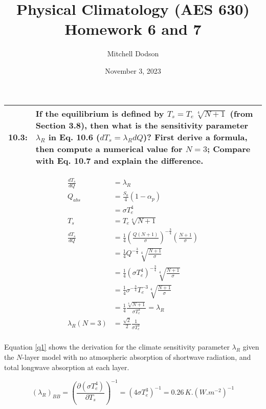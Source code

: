 \documentclass[12pt]{article}
\title{Physical Climatology (AES 630) Homework 6 and 7}
\author{Mitchell Dodson}
\date{November 3, 2023}
\newcommand*{\problem}[2]{
    \begin{table}[ht]
    \centering
        \begin{tabular}{ | p{.1\linewidth} p{.9\linewidth} | }
            \hline
            \vspace{.3em}\textbf{\large#1:} & \vspace{.3em}\small{#2}\hspace{.2em}\vspace{.5em} \\ \hline
        \end{tabular}
    \end{table}
}
\begin{document}
\maketitle

\problem{10.3}{
    If the equilibrium is defined by $T_s = T_e \, \sqrt[4]{N+1}$ (from Section 3.8), then what is the sensitivity parameter $\lambda_R$ in Eq. 10.6 ($dT_s = \lambda_R dQ$)? First derive a formula, then compute a numerical value for $N=3$; Compare with Eq. 10.7 and explain the difference.
} %

\begin{equation}\label{q1}
    \begin{split}
        \frac{dT_s}{dQ} &= \lambda_R \\
        Q_{abs} &= \frac{S_0}{4} (1-\alpha_p) \\
        &= \sigma T_e^4 \\
        T_s &= T_e\sqrt[4]{N+1} \\
        \frac{dT_s}{dQ} &= \frac{1}{4} \left(\frac{Q(N+1)}{\sigma}\right)^{-\frac{3}{4}} \left(\frac{N+1}{\sigma}\right) \\
        &= \frac{1}{4} Q^{-\frac{3}{4}} \sqrt[4]{\frac{N+1}{\sigma}} \\
        &= \frac{1}{4} (\sigma T_e^4)^{-\frac{3}{4}} \sqrt[4]{\frac{N+1}{\sigma}} \\
        &= \frac{1}{4} \sigma^{-\frac{3}{4}} T_e^{-3} \sqrt[4]{\frac{N+1}{\sigma}} \\
        &= \frac{1}{4} \frac{\sqrt[4]{N+1}}{\sigma T_e^3} = \lambda_R \\
        \lambda_R(N=3) &= \frac{\sqrt{2}}{2} \frac{1}{\sigma T_e^3} \\
    \end{split}
\end{equation}

Equation \ref{q1} shows the derivation for the climate sensitivity parameter $\lambda_R$ given the $N$-layer model with no atmospheric absorption of shortwave radiation, and total longwave absorption at each layer.

\begin{equation}\label{eq10.7}
    (\lambda_R)_{BB} = \left(\frac{\partial(\sigma T_e^4)}{\partial T_s}\right)^{-1} = (4\sigma T_e^3)^{-1} = 0.26\,\si{K.(W.m^{-2})^{-1}}
\end{equation}
\end{document}
